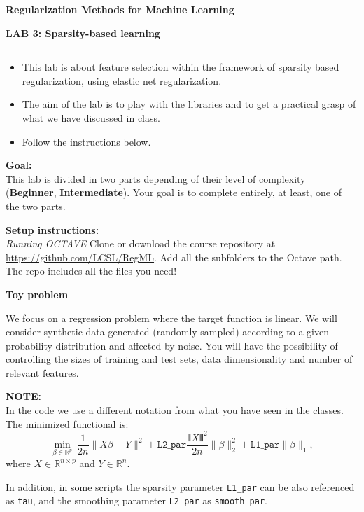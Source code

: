 \documentclass[DIN, pagenumber=false, fontsize=11pt, parskip=half]{scrartcl}
\newcommand{\mytitle}[1]{{\noindent\LARGE\textbf{#1}}}
\newcommand{\mysection}[1]{\noindent\large\textbf{#1}}
\begin{document}
\noindent\textbf{Regularization Methods for Machine Learning}

\mytitle{LAB 3: Sparsity-based learning}\\
\rule{\textwidth}{1pt}
\begin{itemize}\itemsep1pt \parskip0pt 
  \item This lab is about feature selection within the framework of sparsity based regularization, using elastic net regularization.
  \item The aim of the lab is to play with the libraries and to get a practical grasp of what we have discussed in class.
  \item Follow the instructions below.
\end{itemize}

\begin{framed}
\textbf{\textbf{Goal}:} \\
This lab is divided in two parts depending of their level of complexity (\textbf{Beginner}, \textbf{Intermediate}). Your goal is to complete entirely, at least, one of the two parts.
\end{framed}

\begin{framed}
\textbf{\textbf{Setup instructions}:} \\
\textit{Running OCTAVE}
Clone or download the course repository at \url{https://github.com/LCSL/RegML}. Add all the subfolders to the Octave path. The repo includes all the files you need!
\end{framed}

\mysection{Toy problem}

We focus on a regression problem where the target function is linear. We will consider synthetic data generated (randomly sampled) according to a given probability distribution and affected by noise. You will have the possibility of controlling the sizes of training and test sets, data dimensionality and number of relevant features.

\begin{framed}
\textbf{NOTE:} \\
In the code we use a different notation from what you have seen in the classes. The minimized functional is:
\begin{equation*}
\min_{\beta\in \mathbb{R}^p} \  \frac{1}{2n} \|X\beta-Y\|^2 +
\texttt{L2\_par} \frac{\VERT X \VERT^2}{2n}\|\beta\|^2_2 +
\texttt{L1\_par}\|\beta\|_1 ,
\end{equation*}
where $X \in \mathbb{R}^{n \times p}$ and $Y \in \mathbb{R}^n$.

In addition, in some  scripts the sparsity parameter \texttt{L1\_par} can be also referenced as \texttt{tau}, and the smoothing parameter \texttt{L2\_par} as \texttt{smooth\_par}.
\end{framed}
\end{document}
